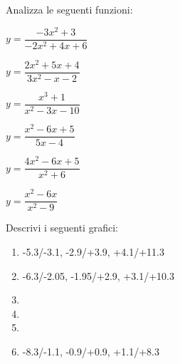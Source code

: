 \begin{esercizio}\label{ese:stufun.3e}
Analizza le seguenti funzioni:
\begin{multicols}{3}
 \begin{enumeratea}
  \item \(y = \dfrac{-3x^2 +3}{-2x^2 +4x +6}\) \\ %
  \item \(y = \dfrac{2x^2+5x+4}{3x^2-x-2}\) %
  \item \(y = \dfrac{x^3 +1}{x^2 -3x -10}\) \\ %
  \item \(y = \dfrac{x^2 - 6x + 5}{5x - 4}\) %
  \item \(y = \dfrac{4x^2 -6x +5}{x^2 +6}\) \\ %
  \item \(y = \dfrac{x^2 -6x}{x^2 -9}\) %
 \end{enumeratea}
\end{multicols}
\end{esercizio}

\bigskip

\begin{esercizio}\label{ese:stufun.4g}
Descrivi i seguenti grafici:
\begin{multicols}{2}
 \begin{enumerate} [left=0pt, label=\alph*)]
  \item \myp 
{} 
{-5.3/-3.1, -2.9/+3.9, +4.1/+11.3}%
  \item \myp 
{} 
{-6.3/-2.05, -1.95/+2.9, +3.1/+10.3}%
  \item \myp 
{}%
  \item \myp 
{} %
\item \myp 
{}%
\item \myp 
{}
{-8.3/-1.1, -0.9/+0.9, +1.1/+8.3}%
 \end{enumerate}
\end{multicols}
\end{esercizio}

